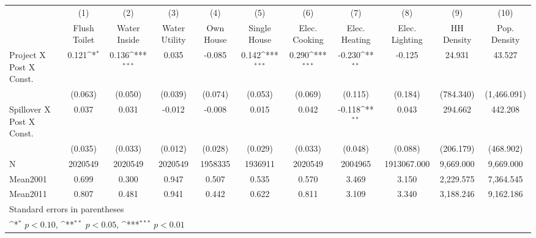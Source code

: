 {
\def\sym#1{\ifmmode^{#1}\else\(^{#1}\)\fi}
\begin{tabular}{l*{10}{c}}
\hline\hline
                &\multicolumn{1}{c}{(1)}&\multicolumn{1}{c}{(2)}&\multicolumn{1}{c}{(3)}&\multicolumn{1}{c}{(4)}&\multicolumn{1}{c}{(5)}&\multicolumn{1}{c}{(6)}&\multicolumn{1}{c}{(7)}&\multicolumn{1}{c}{(8)}&\multicolumn{1}{c}{(9)}&\multicolumn{1}{c}{(10)}\\
                &\multicolumn{1}{c}{Flush Toilet}&\multicolumn{1}{c}{Water Inside}&\multicolumn{1}{c}{Water Utility}&\multicolumn{1}{c}{Own House}&\multicolumn{1}{c}{Single House}&\multicolumn{1}{c}{Elec. Cooking}&\multicolumn{1}{c}{Elec. Heating}&\multicolumn{1}{c}{Elec. Lighting}&\multicolumn{1}{c}{HH Density}&\multicolumn{1}{c}{Pop. Density}\\
\hline
Project X Post X Const.&    0.121\sym{*}  &    0.136\sym{***}&    0.035         &   -0.085         &    0.142\sym{***}&    0.290\sym{***}&   -0.230\sym{**} &   -0.125         &   24.931         &   43.527         \\
                &  (0.063)         &  (0.050)         &  (0.039)         &  (0.074)         &  (0.053)         &  (0.069)         &  (0.115)         &  (0.184)         &(784.340)         &(1,466.091)         \\
[1em]
Spillover X Post X Const.&    0.037         &    0.031         &   -0.012         &   -0.008         &    0.015         &    0.042         &   -0.118\sym{**} &    0.043         &  294.662         &  442.208         \\
                &  (0.035)         &  (0.033)         &  (0.012)         &  (0.028)         &  (0.029)         &  (0.033)         &  (0.048)         &  (0.088)         &(206.179)         &(468.902)         \\
\hline
N               &2020549       &2020549         &2020549       &1958335      &1936911       &2020549       &2004965    &1913067.000         &9,669.000         &9,669.000         \\
Mean2001        &    0.699         &    0.300         &    0.947         &    0.507         &    0.535         &    0.570         &    3.469         &    3.150         &2,229.575         &7,364.545         \\
Mean2011        &    0.807         &    0.481         &    0.941         &    0.442         &    0.622         &    0.811         &    3.109         &    3.340         &3,188.246         &9,162.186         \\
\hline\hline
\multicolumn{11}{l}{\footnotesize Standard errors in parentheses}\\
\multicolumn{11}{l}{\footnotesize \sym{*} \(p<0.10\), \sym{**} \(p<0.05\), \sym{***} \(p<0.01\)}\\
\end{tabular}
}
